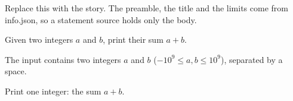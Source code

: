 Replace this with the story. The preamble, the title and the limits come from
info.json, so a statement source holds only the body.

Given two integers $a$ and $b$, print their sum $a + b$.

\InputFile

The input contains two integers $a$ and $b$
($-10^9 \le a, b \le 10^9$), separated by a space.

\OutputFile

Print one integer: the sum $a + b$.
